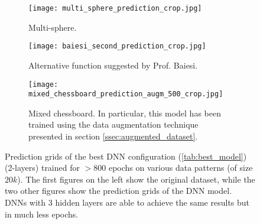 \begin{figure}[b] %
  \centering
  \begin{subfigure}{\columnwidth}
  \texttt{[image: multi\_sphere\_prediction\_crop.jpg]}
  \caption{\label{fig:predictions_spheres} Multi-sphere.}
  \end{subfigure}
  
  \begin{subfigure}{\columnwidth}
  \texttt{[image: baiesi\_second\_prediction\_crop.jpg]}
  \caption{\label{fig:predictions_baiesi} Alternative function suggested by Prof. Baiesi.}
  \end{subfigure}
  
  \begin{subfigure}{\columnwidth}
  \texttt{[image: mixed\_chessboard\_prediction\_augm\_500\_crop.jpg]}
  \caption{\label{fig:predictions_chessboard} Mixed chessboard. In particular, this model has been trained using the data augmentation technique presented in section \ref{ssec:augmented_dataset}.}
  \end{subfigure}
  
  \caption{\label{fig:predictions_complex}Prediction grids of the best DNN configuration (\ref{tab:best_model}) (2-layers) trained for $> 800$ epochs on various data patterns (of size $20k$). The first figures on the left show the original dataset, while the two other figures show the prediction grids of the DNN model. DNNs with 3 hidden layers are able to achieve the same results but in much less epochs.}
\end{figure}